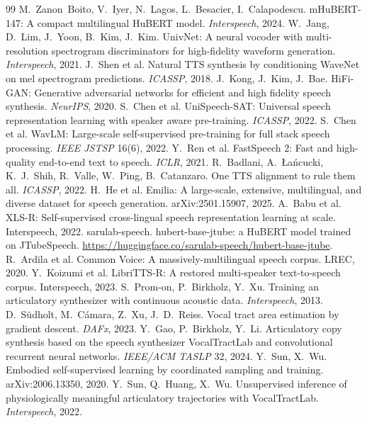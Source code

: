 \documentclass[10pt,a4paper,twocolumn]{article}
\begin{document}
\begin{thebibliography}{99}
 M.~Zanon~Boito, V.~Iyer, N.~Lagos, L.~Besacier, I.~Calapodescu. mHuBERT-147: A
compact multilingual HuBERT model. \emph{Interspeech}, 2024.
 W.~Jang, D.~Lim, J.~Yoon, B.~Kim, J.~Kim. UnivNet: A neural vocoder with
multi-resolution spectrogram discriminators for high-fidelity waveform generation.
\emph{Interspeech}, 2021.
 J.~Shen et al. Natural TTS synthesis by conditioning WaveNet on mel
spectrogram predictions. \emph{ICASSP}, 2018.
 J.~Kong, J.~Kim, J.~Bae. HiFi-GAN: Generative adversarial networks for
efficient and high fidelity speech synthesis. \emph{NeurIPS}, 2020.
 S.~Chen et al. UniSpeech-SAT: Universal speech representation learning
with speaker aware pre-training. \emph{ICASSP}, 2022.
 S.~Chen et al. WavLM: Large-scale self-supervised pre-training for full stack
speech processing. \emph{IEEE JSTSP} 16(6), 2022.
 Y.~Ren et al. FastSpeech 2: Fast and high-quality end-to-end text to speech.
\emph{ICLR}, 2021.
 R.~Badlani, A.~Łańcucki, K.~J.~Shih, R.~Valle, W.~Ping, B.~Catanzaro. One TTS
alignment to rule them all. \emph{ICASSP}, 2022.
 H.~He et al. Emilia: A large-scale, extensive, multilingual, and diverse dataset
for speech generation. arXiv:2501.15907, 2025.
 A.~Babu et al. XLS-R: Self-supervised cross-lingual speech representation learning
at scale. Interspeech, 2022.
 sarulab-speech. hubert-base-jtube: a HuBERT model trained on JTubeSpeech.
\url{https://huggingface.co/sarulab-speech/hubert-base-jtube}.
 R.~Ardila et al. Common Voice: A massively-multilingual speech corpus. LREC, 2020.
 Y.~Koizumi et al. LibriTTS-R: A restored multi-speaker text-to-speech corpus. Interspeech, 2023.
 S.~Prom-on, P.~Birkholz, Y.~Xu. Training an articulatory synthesizer with
continuous acoustic data. \emph{Interspeech}, 2013.
 D.~Südholt, M.~Cámara, Z.~Xu, J.~D.~Reiss. Vocal tract area estimation by
gradient descent. \emph{DAFx}, 2023.
 Y.~Gao, P.~Birkholz, Y.~Li. Articulatory copy synthesis based on the speech
synthesizer VocalTractLab and convolutional recurrent neural networks. \emph{IEEE/ACM TASLP}
32, 2024.
 Y.~Sun, X.~Wu. Embodied self-supervised learning by coordinated sampling and
training. arXiv:2006.13350, 2020.
 Y.~Sun, Q.~Huang, X.~Wu. Unsupervised inference of physiologically meaningful
articulatory trajectories with VocalTractLab. \emph{Interspeech}, 2022.

\end{thebibliography}
\end{document}
